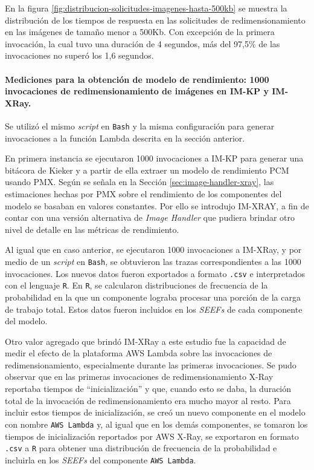 En la figura \ref{fig:distribucion-solicitudes-imagenes-hasta-500kb} se muestra la distribución de los tiempos de respuesta en las solicitudes de redimensionamiento en las imágenes de tamaño menor a 500Kb. Con excepción de la primera invocación, la cual tuvo una duración de 4 segundos, más del 97,5\% de las invocaciones no superó los 1,6 segundos.

\paragraph{Mediciones para la obtención de modelo de rendimiento: 1000 invocaciones de redimensionamiento de imágenes en IM-KP y IM-XRay.} Se utilizó el mismo \emph{script} en \texttt{Bash} y la misma configuración para generar invocaciones a la función Lambda descrita en la sección anterior.

En primera instancia se ejecutaron 1000 invocaciones a IM-KP para generar una bitácora de Kieker y a partir de ella extraer un modelo de rendimiento PCM usando PMX. Según se señala en la Sección \ref{sec:image-handler-xray}, las estimaciones hechas por PMX sobre el rendimiento de los componentes del modelo se basaban en valores constantes. Por ello se introdujo IM-XRAY, a fin de contar con una versión alternativa de \emph{Image Handler} que pudiera brindar otro nivel de detalle en las métricas de rendimiento. 

Al igual que en caso anterior, se ejecutaron 1000 invocaciones a IM-XRay, y por medio de un \emph{script} en \texttt{Bash}, se obtuvieron las trazas correspondientes a las 1000 invocaciones. Los nuevos datos fueron exportados a formato \texttt{.csv} e interpretados con el lenguaje \texttt{R}. En \texttt{R}, se calcularon distribuciones de frecuencia de la probabilidad en la que un componente lograba procesar una porción de la carga de trabajo total. Estos datos fueron incluidos en los \emph{SEEFs} de cada componente del modelo. 

Otro valor agregado que brindó IM-XRay a este estudio fue la capacidad de medir el efecto de la plataforma AWS Lambda sobre las invocaciones de redimensionamiento, especialmente durante las primeras invocaciones. Se pudo observar que en las primeras invocaciones de redimensionamiento X-Ray reportaba tiempos de ``inicialización'' y que, cuando esto se daba, la duración total de la invocación de redimensionamiento era mucho mayor al resto. Para incluir estos tiempos de inicialización, se creó un nuevo componente en el modelo con nombre \texttt{AWS Lambda} y, al igual que en los demás componentes, se tomaron los tiempos de inicialización reportados por AWS X-Ray, se exportaron en formato \texttt{.csv} a \texttt{R} para obtener una distribución de frecuencia de la probabilidad e incluirla en los \emph{SEEFs} del componente \texttt{AWS Lambda}. 


